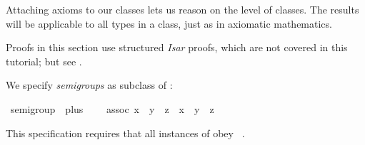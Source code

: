 %
\begin{isabellebody}%
\def\isabellecontext{Axioms}%
%
\isadelimtheory
%
\endisadelimtheory
%
\isatagtheory
%
\endisatagtheory
{\isafoldtheory}%
%
\isadelimtheory
%
\endisadelimtheory
%
\isamarkuptrue%
%
\begin{isamarkuptext}%
Attaching axioms to our classes lets us reason on the level of
classes.  The results will be applicable to all types in a class, just
as in axiomatic mathematics.

\begin{warn}
Proofs in this section use structured \emph{Isar} proofs, which are not
covered in this tutorial; but see \cite{Nipkow-TYPES02}.%
\end{warn}%
\end{isamarkuptext}%
\isamarkuptrue%
%
\isamarkuptrue%
%
\begin{isamarkuptext}%
We specify \emph{semigroups} as subclass of :%
\end{isamarkuptext}%
\isamarkuptrue%
\isamarkupfalse%
\ semigroup\ {\isacharequal}\ plus\ {\isacharplus}\isanewline
\ \ \ assoc{\isacharcolon}\ {\isachardoublequoteopen}{\isacharparenleft}x\ {\isasymoplus}\ y{\isacharparenright}\ {\isasymoplus}\ z\ {\isacharequal}\ x\ {\isasymoplus}\ {\isacharparenleft}y\ {\isasymoplus}\ z{\isacharparenright}{\isachardoublequoteclose}%
\begin{isamarkuptext}%
\noindent This \hyperlink{command.class}{\mbox{}} specification requires that
all instances of  obey \hyperlink{fact.assoc:}{\mbox{}}~.


\end{isamarkuptext}
\end{isabellebody}
